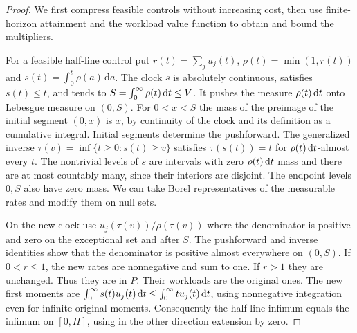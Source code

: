 \begin{proof}
We first compress feasible controls without increasing cost, then use finite-horizon attainment and the workload value function to obtain and bound the multipliers.

For a feasible half-line control put $r(t)=\sum_j u_j(t)$, $\rho(t)=\min(1,r(t))$ and $s(t)=\int_0^t\rho(a)\,\mathrm{d}a$. The clock $s$ is absolutely continuous, satisfies $s(t)\leq t$, and tends to $S=\int_0^\infty\rho(t)\,\mathrm{d}t\leq V$. It pushes the measure $\rho(t)\,\mathrm{d}t$ onto Lebesgue measure on $(0,S)$. For $0<x<S$ the mass of the preimage of the initial segment $(0,x)$ is $x$, by continuity of the clock and its definition as a cumulative integral. Initial segments determine the pushforward. The generalized inverse $\tau(v)=\inf\{t\geq0:s(t)\geq v\}$ satisfies $\tau(s(t))=t$ for $\rho(t)\,\mathrm{d}t$-almost every $t$. The nontrivial levels of $s$ are intervals with zero $\rho(t)\,\mathrm{d}t$ mass and there are at most countably many, since their interiors are disjoint. The endpoint levels $0,S$ also have zero mass. We can take Borel representatives of the measurable rates and modify them on null sets.

On the new clock use $u_j(\tau(v))/\rho(\tau(v))$ where the denominator is positive and zero on the exceptional set and after $S$. The pushforward and inverse identities show that the denominator is positive almost everywhere on $(0,S)$. If $0<r\leq1$, the new rates are nonnegative and sum to one. If $r>1$ they are unchanged. Thus they are in $P$. Their workloads are the original ones. The new first moments are $\int_0^\infty s(t)u_j(t)\,\mathrm{d}t\leq\int_0^\infty t u_j(t)\,\mathrm{d}t$, using nonnegative integration even for infinite original moments. Consequently the half-line infimum equals the infimum on $[0,H]$, using in the other direction extension by zero.


\end{proof}

